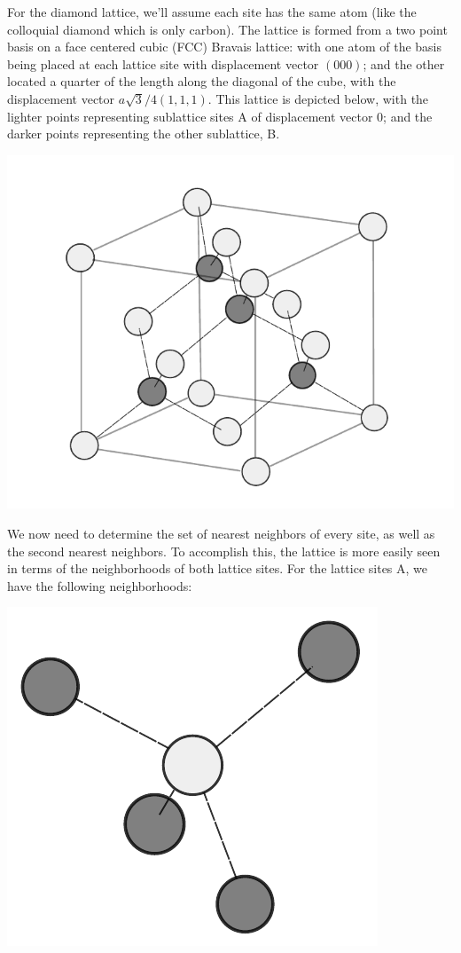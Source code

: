 \documentclass[10pt,a4paper]{article}
\begin{document}
\begin{multicols}{2}
For the diamond lattice, we'll assume each site has the same atom (like the colloquial diamond which is only carbon). The lattice is formed from a two point basis 
on a face centered cubic (FCC) Bravais lattice: with one atom of the basis being placed at each lattice site with displacement vector $(000)$; and the other located 
a quarter of the length along the diagonal of the cube, with the displacement vector $a\sqrt{3}/4(1,1,1)$. This lattice is depicted below, with the lighter points representing 
sublattice sites A of displacement vector 0; and the darker points representing the other sublattice, B.
\begin{center}
\includegraphics[scale=0.71]{diamond_uc.pdf}
\end{center}
We now need to determine the set of nearest neighbors of every site, as well as the second nearest neighbors. To accomplish this, the lattice is more easily seen in terms of the neighborhoods of both lattice sites. For the lattice sites A, we have the following neighborhoods:
\begin{center}
\includegraphics[scale=0.63]{diamond_a.pdf}

\end{center}
\end{multicols}
\end{document}
